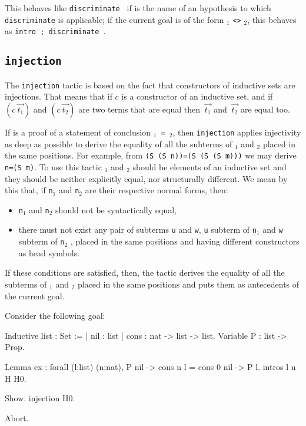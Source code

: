 \begin{coq_example*}
\begin{Variants}
  This behaves like {\tt discriminate {\ident}} if {\ident} is the
  name of an hypothesis to which {\tt discriminate} is applicable; if
  the current goal is of the form {\term$_1$} {\tt <>} {\term$_2$},
  this behaves as {\tt intro {\ident}; discriminate {\ident}}.

  \ErrMsg {}
\end{Variants}

\subsection{\tt injection \term}
\label{injection}

The {\tt injection} tactic is based on the fact that constructors of
inductive sets are injections. That means that if $c$ is a constructor
of an inductive set, and if $(c~\vec{t_1})$ and $(c~\vec{t_2})$ are two
terms that are equal then $~\vec{t_1}$ and $~\vec{t_2}$ are equal
too.

If {\term} is a proof of a statement of conclusion
 {\tt {\term$_1$} = {\term$_2$}},
then {\tt injection} applies injectivity as deep as possible to
derive the equality of all the subterms of {\term$_1$} and {\term$_2$}
placed in the same positions. For example, from {\tt (S
  (S n))=(S (S (S m)))} we may derive {\tt n=(S m)}.  To use this
tactic {\term$_1$} and {\term$_2$} should be elements of an inductive
set and they should be neither explicitly equal, nor structurally
different. We mean by this that, if {\tt n$_1$} and {\tt n$_2$} are
their respective normal forms, then:
\begin{itemize}
\item {\tt n$_1$} and {\tt n$_2$} should not be syntactically equal,
\item there must not exist any pair of subterms {\tt u} and {\tt w},
  {\tt u} subterm of {\tt n$_1$} and {\tt w} subterm of {\tt n$_2$} ,
  placed in the same positions and having different constructors as
  head symbols.
\end{itemize}
If these conditions are satisfied, then, the tactic derives the
equality of all the subterms of {\term$_1$} and {\term$_2$} placed in
the same positions and puts them as antecedents of the current goal.

\Example Consider the following goal:

\begin{coq_example*}
Inductive list : Set :=
  | nil : list
  | cons : nat -> list -> list.
Variable P : list -> Prop.
\end{coq_example*}
\begin{coq_eval}
Lemma ex :
 forall (l:list) (n:nat), P nil -> cons n l = cons 0 nil -> P l.
intros l n H H0.
\end{coq_eval}
\begin{coq_example}
Show.
injection H0.
\end{coq_example}
\begin{coq_eval}
Abort.
\end{coq_eval}


\end{coq_example*}
